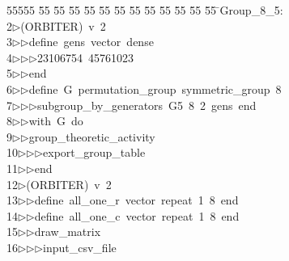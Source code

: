 %
%
\begin{tabbing}
55555 \= 55 \= 55 \= 55 \= 55 \= 55 \= 55 \= 55 \= 55 \= 55 \= 55 \= 55 \= 55 \= \>Group\_8\_5:\\[0pt]
2\>$\triangleright$\>(ORBITER)\ v\ 2\ \\[0pt]
3\>$\triangleright$\>$\triangleright$\>define\ gens\ vector\ dense\ \\[0pt]
4\>$\triangleright$\>$\triangleright$\>$\triangleright$\>23106754\ 45761023\ \\[0pt]
5\>$\triangleright$\>$\triangleright$\>end\ \\[0pt]
6\>$\triangleright$\>$\triangleright$\>define\ G\ permutation\_group\ symmetric\_group\ 8\ \\[0pt]
7\>$\triangleright$\>$\triangleright$\>$\triangleright$\>subgroup\_by\_generators\ G5\ 8\ 2\ gens\ end\ \\[0pt]
8\>$\triangleright$\>$\triangleright$\>with\ G\ do\ \\[0pt]
9\>$\triangleright$\>$\triangleright$\>group\_theoretic\_activity\ \\[0pt]
10\>$\triangleright$\>$\triangleright$\>$\triangleright$\>export\_group\_table\ \\[0pt]
11\>$\triangleright$\>$\triangleright$\>end\\[0pt]
12\>$\triangleright$\>(ORBITER)\ v\ 2\ \\[0pt]
13\>$\triangleright$\>$\triangleright$\>define\ all\_one\_r\ vector\ repeat\ 1\ 8\ end\ \\[0pt]
14\>$\triangleright$\>$\triangleright$\>define\ all\_one\_c\ vector\ repeat\ 1\ 8\ end\ \\[0pt]
15\>$\triangleright$\>$\triangleright$\>draw\_matrix\ \\[0pt]
16\>$\triangleright$\>$\triangleright$\>$\triangleright$\>input\_csv\_file\ \\[0pt]

\end{tabbing}
